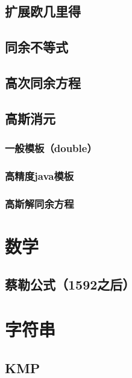 \documentclass{article}
\begin{document}
\subsection{扩展欧几里得}


\subsection{同余不等式}


\subsection{高次同余方程}


\subsection{高斯消元}
\subsubsection{一般模板（double）}

\subsubsection{高精度java模板}

\subsubsection{高斯解同余方程}
   

\section{数学}

\subsection{蔡勒公式（1592之后）}
 


\section{字符串}

\subsection{KMP}
\end{document}
